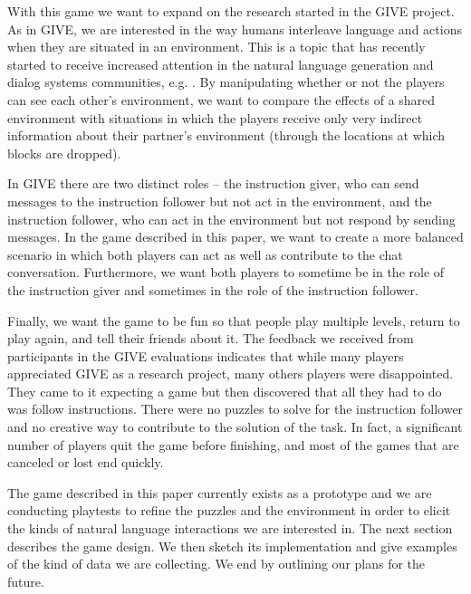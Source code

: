 With this game we want to expand on the research started in the GIVE
project. As in GIVE, we are interested in the way humans interleave
language and actions when they are situated in an environment. This is
a topic that has recently started to receive increased attention in
the natural language generation and dialog systems communities, e.g.
\cite{stoia-etal-2006,garoufi-koller-2010,dethlefs-etal-2011}.  By
manipulating whether or not the players can see each other's
environment, we want to compare the effects of a shared environment
with situations in which the players receive only very indirect
information about their partner's environment (through the locations
at which blocks are dropped).

In GIVE there are two distinct roles -- the instruction giver, who can
send messages to the instruction follower but not act in the
environment, and the instruction follower, who can act in the
environment but not respond by sending messages. In the game described
in this paper, we want to create a more balanced scenario in which
both players can act as well as contribute to the chat
conversation. Furthermore, we want both players to sometime be in the
role of the instruction giver and sometimes in the role of the
instruction follower.


Finally, we want the game to be fun so that people play multiple
levels, return to play again, and tell their friends about it.  The
feedback we received from participants in the GIVE evaluations
indicates that while many players appreciated GIVE as a research
project, many others players were disappointed. They came to it
expecting a game but then discovered that all they had to do was
follow instructions. There were no puzzles to solve for the
instruction follower and no creative way to contribute to the solution
of the task. In fact, a significant number of players quit the game
before finishing, and most of the games that are canceled or lost end
quickly.

The game described in this paper currently exists as a prototype and
we are conducting playtests to refine the puzzles and the environment
in order to elicit the kinds of natural language interactions we are
interested in. The next section describes the game design. We then
sketch its implementation and give examples of the kind of data we are
collecting. We end by outlining our plans for the future.


